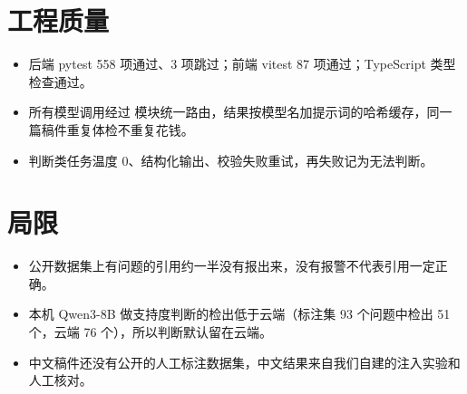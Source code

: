 \documentclass[UTF8,zihao=5,fontset=none]{ctexart}
\begin{document}
\section{工程质量}

\begin{itemize}
\item 后端 pytest 558 项通过、3 项跳过；前端 vitest 87 项通过；TypeScript 类型检查通过。
\item 所有模型调用经过  模块统一路由，结果按模型名加提示词的哈希缓存，同一篇稿件重复体检不重复花钱。
\item 判断类任务温度 0、结构化输出、校验失败重试，再失败记为无法判断。
\end{itemize}

\section{局限}

\begin{itemize}
\item 公开数据集上有问题的引用约一半没有报出来，没有报警不代表引用一定正确。
\item 本机 Qwen3-8B 做支持度判断的检出低于云端（标注集 93 个问题中检出 51 个，云端 76 个），所以判断默认留在云端。
\item 中文稿件还没有公开的人工标注数据集，中文结果来自我们自建的注入实验和人工核对。
\end{itemize}
\end{document}
